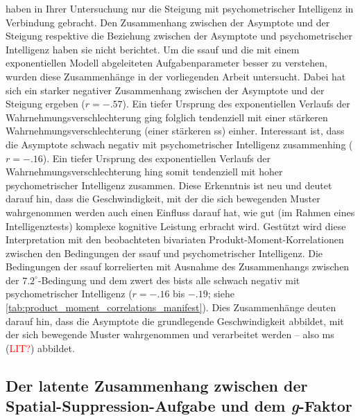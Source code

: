 \documentclass[11pt, twoside, a4paper]{book}		%
\begin{document}
\citet{Melnick2013} haben in Ihrer Untersuchung nur die Steigung mit psychometrischer Intelligenz in Verbindung gebracht. Den Zusammenhang zwischen der Asymptote und der Steigung respektive die Beziehung zwischen der Asymptote und psychometrischer Intelligenz haben sie nicht berichtet. Um die \gls{ssauf} und die mit einem exponentiellen Modell abgeleiteten Aufgabenparameter besser zu verstehen, wurden diese Zusammenhänge in der vorliegenden Arbeit untersucht. Dabei hat sich ein starker negativer Zusammenhang zwischen der Asymptote und der Steigung ergeben ($r=-.57$). Ein tiefer Ursprung des exponentiellen Verlaufs der Wahrnehmungsverschlechterung ging folglich tendenziell mit einer stärkeren Wahrnehmungsverschlechterung (einer stärkeren \gls{ss}) einher.
Interessant ist, dass die Asymptote schwach negativ mit psychometrischer Intelligenz zusammenhing ($r=-.16$). Ein tiefer Ursprung des exponentiellen Verlaufs der Wahrnehmungsverschlechterung hing somit tendenziell mit hoher psychometrischer Intelligenz zusammen. Diese Erkenntnis ist neu und deutet darauf hin, dass die Geschwindigkeit, mit der die sich bewegenden Muster wahrgenommen werden auch einen Einfluss darauf hat, wie gut (im Rahmen eines Intelligenztests) komplexe kognitive Leistung erbracht wird. 
Gestützt wird diese Interpretation mit den beobachteten bivariaten Produkt-Moment-Korrelationen zwischen den Bedingungen der \gls{ssauf} und psychometrischer Intelligenz. Die Bedingungen der \gls{ssauf} korrelierten mit Ausnahme des Zusammenhangs zwischen der $7.2^{\circ}$-Bedingung und dem \gls{zwert} des \gls{bist}s alle schwach negativ mit psychometrischer Intelligenz ($r=-.16$ bis $-.19$; siehe \autoref{tab:product_moment_correlations_manifest}). Dies Zusammenhänge deuten darauf hin, dass die Asymptote die grundlegende Geschwindigkeit abbildet, mit der sich bewegende Muster wahrgenommen und verarbeitet werden -- also \gls{ms} (\textcolor{red}{LIT?}) abbildet.










\subsection{Der latente Zusammenhang zwischen der Spa\-tial-Sup\-pres\-sion-Auf\-gabe und dem \textit{g}-Faktor}
\end{document}

